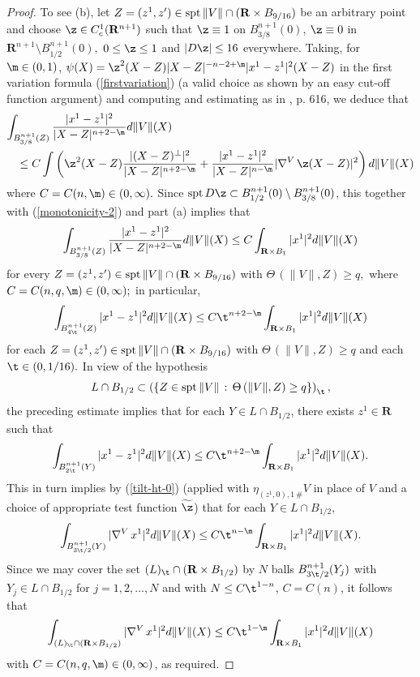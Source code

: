 \documentclass[a4paper,11pt]{amsart}
\begin{document}
\begin{proof}
To see (b), let $Z = (z^{1},z^{\prime}) \in {\rm spt} \, \|V\| \cap ({\mathbf R} \times B_{9/16})$ be an arbitrary point and choose $\z \in C^{1}_{c}({\mathbf R}^{n+1})$ such that
$\z \equiv 1$ on $B_{3/8}^{n+1}(0)$, $\z \equiv 0$ in ${\mathbf R}^{n+1} \setminus B_{1/2}^{n+1}(0),$ $0 \leq \z \leq 1$ and $|D\z| \leq 16$ everywhere. Taking, for $\m \in (0, 1)$, $\psi(X) = \z^{2}(X - Z)|X - Z|^{-n-2+\m}|x^{1} - z^{1}|^{2}(X-Z)$ in the first variation formula (\ref{firstvariation})  (a valid choice as shown by an easy cut-off function argument) and computing and estimating as in \cite{S}, p. 616, we deduce that 
\begin{eqnarray*}
\int_{B_{3/8}^{n+1}(Z)} \frac{|x^{1} - z^{1}|^{2}}{|X - Z|^{n+2-\m}}d\|V\|(X)\nonumber\\ 
&&\hspace{-2in}\leq C\int \left(\z^{2}(X - Z)
\frac{|(X - Z)^{\perp}|^{2}}{|X - Z|^{n+2-\m}} + \frac{|x^{1} - z^{1}|^{2}}{|X - Z|^{n - \m}} |\nabla^{V} \, \z(X - Z)|^{2}\right) d\|V\|(X)
\end{eqnarray*}
where $C = C(n, \m) \in (0, \infty).$ Since ${\rm spt} \, D\z \subset B^{n+1}_{1/2}(0) \setminus B^{n+1}_{3/8}(0)$, this together with
(\ref{monotonicity-2}) and part (a)  implies that 
\begin{equation*}
\int_{B_{3/8}^{n+1}(Z)} \frac{|x^{1} - z^{1}|^{2}}{|X - Z|^{n+2 - \m}} d\|V\|(X) \leq C\int_{{\mathbf R} \times B_{1}} 
|x^{1}|^{2}d\|V\|(X)
\end{equation*}
for every $Z = (z^{1}, z^{\prime}) \in {\rm spt} \, \|V\| \cap ({\mathbf R} \times B_{9/16})$ with 
$\Theta \, (\|V\|, Z) \geq q,$ where $C = C(n, q, \m) \in (0, \infty); $ in particular, 
\begin{equation*}
\int_{B_{4\t}^{n+1}(Z)} |x^{1} -z^{1} |^{2} d\|V\|(X)
\leq C\t^{n+2 - \m}\int_{{\mathbf R} \times B_{1}} |x^{1}|^{2} d\|V\|(X)
\end{equation*}
for each $Z = (z^{1},z^{\prime}) \in {\rm spt} \, \|V\| \cap ({\mathbf R} \times B_{9/16})$ with $\Theta \, (\|V\|, Z) \geq q$ and each $\t \in (0, 1/16).$ In view of the hypothesis 
$$L \cap B_{1/2} \subset \left(\{Z  \in {\rm spt} \, \|V\|\, : \, 
\Theta \, (\|V\|, Z) \geq q\}\right)_{\t},$$
the preceding estimate implies that for each $Y \in L \cap B_{1/2}$, there exists $z^{1} \in {\mathbf R}$ such that
$$\int_{B_{2\t}^{n+1}(Y)} |x^{1} - z^{1}|^{2}d\|V\|(X)\leq C\t^{n+2 -\m}\int_{{\mathbf R} \times B_{1}} |x^{1}|^{2} d\|V\|(X).$$
This in turn implies by (\ref{tilt-ht-0}) (applied with $\eta_{(z^{1}, 0), 1 \, \#} V$ in place of $V$ and a choice of appropriate test function $\widetilde\z$) that for each $Y \in L \cap B_{1/2},$
$$\int_{B_{3\t/2}^{n+1}(Y)} |\nabla^{V} \,x^{1}|^{2} d\|V\|(X) \leq C\t^{n-\m}\int_{{\mathbf R} \times B_{1}} |x^{1}|^{2} d\|V\|(X).$$
Since we may cover the set $(L)_{\t} \cap ({\mathbf R} \times B_{1/2})$ by $N$ balls 
$B_{3\t/2}^{n+1}(Y_{j})$ with $Y_{j} \in L \cap B_{1/2}$ for $j=1, 2, \ldots, N$ 
and with $N \leq C\t^{1-n}$, $C = C(n)$, it follows that 
$$\int_{(L)_{\t} \cap ({\mathbf R} \times B_{1/2})}|\nabla^{V} \,x^{1}|^{2}
d\|V\|(X) \leq C \t^{1-\m}\int_{{\mathbf R} \times B_{1}} |x^{1}|^{2} d\|V\|(X)$$
with $C = C(n , q, \m) \in (0, \infty)$, as required.
\end{proof}
\end{document}
